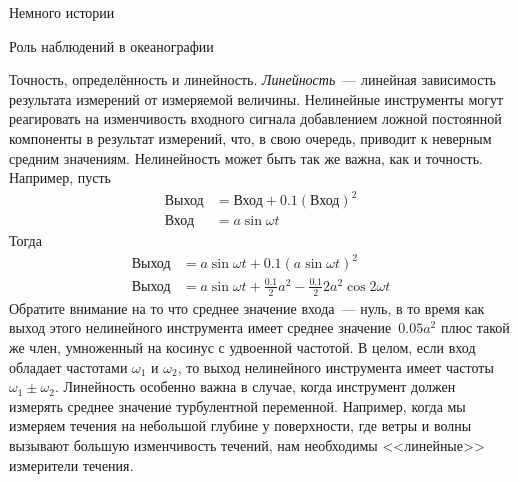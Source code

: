 \begin{chapter}{Немного истории}
\begin{section}{Роль наблюдений в океанографии}
\begin{paragraph}{Точность, определённость и линейность.}
\emph{Линейность}~--- линейная зависимость результата измерений от измеряемой
величины. Нелинейные инструменты могут реагировать на изменчивость входного
сигнала добавлением ложной постоянной компоненты в результат измерений, что,
в свою очередь, приводит к неверным средним значениям. Нелинейность может 
быть так же важна, как и точность. Например, пусть
\begin{align*}
\mbox{Выход} & = \mbox{Вход} + 0.1 (\mbox{Вход})^2 \\
\mbox{Вход}  & = a \sin \omega t
\end{align*}
Тогда
\begin{align*}
\mbox{Выход} & = a \sin \omega t + 0.1 (a \sin \omega t)^2 \\
\mbox{Выход} & = a \sin \omega t + \frac{0.1}{2} a^2 - \frac{0.1}{2}2 a^2 \cos 2\omega t
\end{align*}
Обратите внимание на то что среднее значение входа~--- нуль, в то
время как выход этого нелинейного инструмента имеет среднее значение~$0.05a^2$ 
плюс такой же член, умноженный на косинус с удвоенной
частотой. В целом, если вход обладает частотами $\omega_1$ и $\omega_2$, 
то выход нелинейного инструмента имеет частоты $\omega_1\pm \omega_2$. 
Линейность особенно важна в случае, когда инструмент должен измерять 
среднее значение турбулентной переменной. Например, когда мы измеряем течения 
на небольшой глубине у поверхности, где ветры и волны вызывают большую 
изменчивость течений, нам необходимы <<линейные>> измерители течения.
%
\end{paragraph}


\end{section}
\end{chapter}

